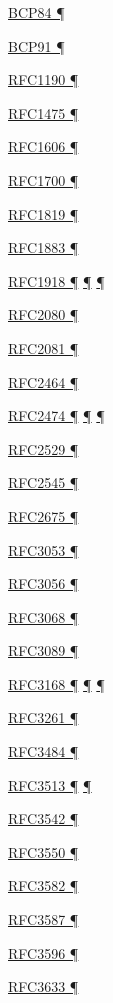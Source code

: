 \documentclass[
]{article}
\begin{document}
\hyperref[multi-prefix-operation]{BCP84 ¶}

\hyperref[dns]{BCP91 ¶}

\hyperref[why-version-6]{RFC1190 ¶}

\hyperref[why-version-6]{RFC1475 ¶}

\hyperref[why-version-6]{RFC1606 ¶}

\hyperref[why-version-6]{RFC1700 ¶}

\hyperref[why-version-6]{RFC1819 ¶}

\hyperref[why-version-6]{RFC1883 ¶}

\hyperref[obsolete-features-in-ipv6]{RFC1918 ¶}
\hyperref[dual-stack-scenarios]{¶} \hyperref[tunnels]{¶}

\hyperref[routing]{RFC2080 ¶}

\hyperref[routing]{RFC2081 ¶}

\hyperref[layer-2-functions]{RFC2464 ¶}

\hyperref[packet-format]{RFC2474 ¶}
\hyperref[traffic-class-and-flow-label]{¶}
\hyperref[transport-protocols]{¶}

\hyperref[obsolete-techniques]{RFC2529 ¶}

\hyperref[routing]{RFC2545 ¶}

\hyperref[packet-size-and-jumbo-frames]{RFC2675 ¶}

\hyperref[obsolete-techniques]{RFC3053 ¶}

\hyperref[obsolete-techniques]{RFC3056 ¶}

\hyperref[obsolete-techniques]{RFC3068 ¶}

\hyperref[obsolete-techniques]{RFC3089 ¶}

\hyperref[packet-format]{RFC3168 ¶}
\hyperref[traffic-class-and-flow-label]{¶}
\hyperref[transport-protocols]{¶}

\hyperref[transport-protocols]{RFC3261 ¶}

\hyperref[source-and-destination-address-selection]{RFC3484 ¶}

\hyperref[obsolete-features-in-ipv6]{RFC3513 ¶}
\hyperref[markdown-usage]{¶}

\hyperref[dual-stack-scenarios]{RFC3542 ¶}

\hyperref[transport-protocols]{RFC3550 ¶}

\hyperref[multihoming]{RFC3582 ¶}

\hyperref[addresses]{RFC3587 ¶}

\hyperref[dns]{RFC3596 ¶}

\hyperref[managed-configuration]{RFC3633 ¶}
\end{document}
